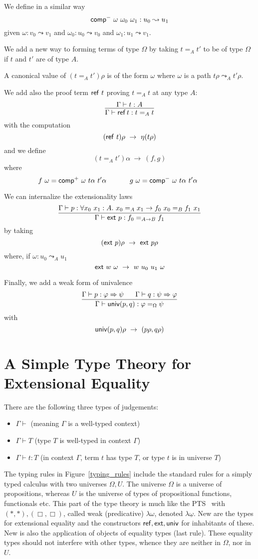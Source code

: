 \documentclass[10pt,a4paper]{article}
\newcommand{\Ref}{{\sf ref}}
\newcommand{\ext}{{\sf ext}}
\newcommand{\univ}{{\sf univ}}
\newcommand{\comp}{{\sf comp}}
\begin{document}
 We define in a similar way
$$
\comp^-~\omega~\omega_0~\omega_1 : u_0\leadsto u_1
$$
given $\omega:v_0\leadsto v_1$ and $\omega_0:u_0\leadsto v_0$ and $\omega_1:u_1\leadsto v_1$.

\medskip

 We add a new way to forming terms of type $\Omega$ by taking $t =_A t'$ to be of type
$\Omega$ if $t$ and $t'$ are of type $A$.

 A canonical value of $(t =_A t')\rho$ is of the form $\omega$ where $\omega$ is a path
$t\rho\leadsto_A t'\rho$.

 We add also the proof term $\Ref~t$ proving $t=_A t$ at any type $A$:
\[
\infer{\Gamma\vdash\Ref\,t:t=_A t}{\Gamma\vdash{t:A}}
\]
with the computation
$$
(\Ref~t)\rho ~\rightarrow~ \eta (t\rho)
$$
and we define
$$
(t =_A t')\alpha ~\rightarrow~ (f,g)
$$
where
$$
f~\omega = \comp^+~\omega~t\alpha~t'\alpha~~~~~~~~~~g~\omega = \comp^-~\omega~t\alpha~t'\alpha~~~~~~~~~~
$$
 
 We can internalize the extensionality laws
$$
\frac{\Gamma\vdash p:\forall x_0~x_1:A.~x_0=_A x_1\rightarrow f_0~x_0 =_ {B} f_1~x_1}
     {\Gamma\vdash \ext~p: f_0 =_{A\rightarrow B} f_1}
$$
by taking
$$
(\ext~p)\rho ~\rightarrow~ \ext~p\rho
$$
where, if $\omega:u_0\leadsto_A u_1$
$$
\ext~w~\omega ~\rightarrow~ w~u_0~u_1~\omega
$$

 Finally, we add a weak form of univalence
$$
\frac{\Gamma\vdash p:\varphi\Rightarrow \psi~~~~~\Gamma\vdash q:\psi\Rightarrow\varphi}
     {\Gamma\vdash \univ (p,q) : \varphi =_{\Omega} \psi}
$$
with 
$$
\univ (p,q)\rho ~\rightarrow~ (p\rho,q\rho)
$$


\section{A Simple Type Theory for Extensional Equality}

There are the following three types of judgements:
\begin{itemize}
\item $\Gamma \vdash {}$ (meaning $\Gamma$ is a well-typed context)
\item $\Gamma \vdash {T}$ (type $T$ is well-typed in context $\Gamma$)
\item $\Gamma \vdash {t:T}$ (in context $\Gamma$, term $t$ has type $T$, or type $t$ is in universe $T$)
\end{itemize}

The typing rules in Figure~\ref{typing_rules} include the standard rules for 
a simply typed calculus with two universes $\Omega,U$. The universe $\Omega$
is a universe of propositions, whereas $U$ is the universe of types of propositional 
functions, functionals etc. This part of the type theory is much like the
PTS~\cite{Barendregtea} with $(*,*),(\Box,\Box)$, 
called weak (predicative) $\lambda{\omega}$, denoted $\lambda\underline{\omega}$.
New are the types for 
extensional equality and the constructors $\Ref,\ext,\univ$ for inhabitants
of these. New is also the application of objects of equality types (last rule).
These equality types should not interfere with other types,
whence they are neither in $\Omega$, nor in $U$.
\end{document}
